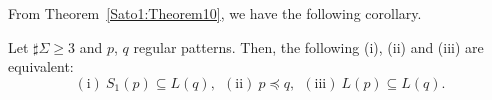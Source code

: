 
From Theorem~\ref{Sato1:Theorem10},%
we have the following corollary.
\begin{col}
    Let $\sharp\Sigma \geq 3$ and $p$, $q$ regular patterns.
    Then, the following (i), (ii) and (iii) are equivalent:
    \[
        (\mathrm{i})\ S_{1}(p) \subseteq L(q),\ \
        (\mathrm{ii})\ p \preceq q,\ \
        (\mathrm{iii})\ L(p) \subseteq L(q).
    \]
\end{col}